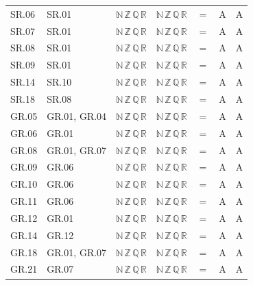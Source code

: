 {\begin{longtable}{l l l l c c c}
SR.06 & SR.01 & $\mathbb N\,\mathbb Z\,\mathbb Q\,\mathbb R$ & $\mathbb N\,\mathbb Z\,\mathbb Q\,\mathbb R$ & $=$ & A & A \\
SR.07 & SR.01 & $\mathbb N\,\mathbb Z\,\mathbb Q\,\mathbb R$ & $\mathbb N\,\mathbb Z\,\mathbb Q\,\mathbb R$ & $=$ & A & A \\
SR.08 & SR.01 & $\mathbb N\,\mathbb Z\,\mathbb Q\,\mathbb R$ & $\mathbb N\,\mathbb Z\,\mathbb Q\,\mathbb R$ & $=$ & A & A \\
SR.09 & SR.01 & $\mathbb N\,\mathbb Z\,\mathbb Q\,\mathbb R$ & $\mathbb N\,\mathbb Z\,\mathbb Q\,\mathbb R$ & $=$ & A & A \\
SR.14 & SR.10 & $\mathbb N\,\mathbb Z\,\mathbb Q\,\mathbb R$ & $\mathbb N\,\mathbb Z\,\mathbb Q\,\mathbb R$ & $=$ & A & A \\
SR.18 & SR.08 & $\mathbb N\,\mathbb Z\,\mathbb Q\,\mathbb R$ & $\mathbb N\,\mathbb Z\,\mathbb Q\,\mathbb R$ & $=$ & A & A \\
GR.05 & GR.01, GR.04 & $\mathbb N\,\mathbb Z\,\mathbb Q\,\mathbb R$ & $\mathbb N\,\mathbb Z\,\mathbb Q\,\mathbb R$ & $=$ & A & A \\
GR.06 & GR.01 & $\mathbb N\,\mathbb Z\,\mathbb Q\,\mathbb R$ & $\mathbb N\,\mathbb Z\,\mathbb Q\,\mathbb R$ & $=$ & A & A \\
GR.08 & GR.01, GR.07 & $\mathbb N\,\mathbb Z\,\mathbb Q\,\mathbb R$ & $\mathbb N\,\mathbb Z\,\mathbb Q\,\mathbb R$ & $=$ & A & A \\
GR.09 & GR.06 & $\mathbb N\,\mathbb Z\,\mathbb Q\,\mathbb R$ & $\mathbb N\,\mathbb Z\,\mathbb Q\,\mathbb R$ & $=$ & A & A \\
GR.10 & GR.06 & $\mathbb N\,\mathbb Z\,\mathbb Q\,\mathbb R$ & $\mathbb N\,\mathbb Z\,\mathbb Q\,\mathbb R$ & $=$ & A & A \\
GR.11 & GR.06 & $\mathbb N\,\mathbb Z\,\mathbb Q\,\mathbb R$ & $\mathbb N\,\mathbb Z\,\mathbb Q\,\mathbb R$ & $=$ & A & A \\
GR.12 & GR.01 & $\mathbb N\,\mathbb Z\,\mathbb Q\,\mathbb R$ & $\mathbb N\,\mathbb Z\,\mathbb Q\,\mathbb R$ & $=$ & A & A \\
GR.14 & GR.12 & $\mathbb N\,\mathbb Z\,\mathbb Q\,\mathbb R$ & $\mathbb N\,\mathbb Z\,\mathbb Q\,\mathbb R$ & $=$ & A & A \\
GR.18 & GR.01, GR.07 & $\mathbb N\,\mathbb Z\,\mathbb Q\,\mathbb R$ & $\mathbb N\,\mathbb Z\,\mathbb Q\,\mathbb R$ & $=$ & A & A \\
GR.21 & GR.07 & $\mathbb N\,\mathbb Z\,\mathbb Q\,\mathbb R$ & $\mathbb N\,\mathbb Z\,\mathbb Q\,\mathbb R$ & $=$ & A & A \\

\end{longtable}}
